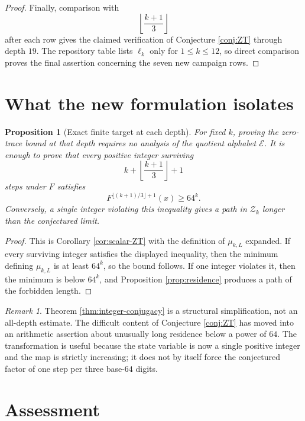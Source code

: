 \documentclass[11pt]{article}
\newtheorem{proposition}[theorem]{Proposition}
\theoremstyle{definition}
\theoremstyle{remark}
\newtheorem{remark}[theorem]{Remark}
\newcommand{\E}{\mathcal{E}}
\begin{document}
\begin{proof}
Finally, comparison with
\[
\left\lfloor\frac{k+1}{3}\right\rfloor
\]
after each row gives the claimed verification of Conjecture \ref{conj:ZT} through depth $19$. The repository table lists $\ell_k$ only for $1\le k\le12$, so direct comparison proves the final assertion concerning the seven new campaign rows.
\end{proof}

\section{What the new formulation isolates}

\begin{proposition}[Exact finite target at each depth]
\label{prop:finite-target}
For fixed $k$, proving the zero-trace bound at that depth requires no analysis of the quotient alphabet $\E$. It is enough to prove that every positive integer surviving
\[
k+\left\lfloor\frac{k+1}{3}\right\rfloor+1
\]
steps under $F$ satisfies
\[
F^{\lfloor(k+1)/3\rfloor+1}(x)\ge64^k.
\]
Conversely, a single integer violating this inequality gives a path in $\mathcal Z_k$ longer than the conjectured limit.
\end{proposition}

\begin{proof}
This is Corollary \ref{cor:scalar-ZT} with the definition of $\mu_{k,L}$ expanded. If every surviving integer satisfies the displayed inequality, then the minimum defining $\mu_{k,L}$ is at least $64^k$, so the bound follows. If one integer violates it, then the minimum is below $64^k$, and Proposition \ref{prop:residence} produces a path of the forbidden length.
\end{proof}

\begin{remark}
Theorem \ref{thm:integer-conjugacy} is a structural simplification, not an all-depth estimate. The difficult content of Conjecture \ref{conj:ZT} has moved into an arithmetic assertion about unusually long residence below a power of $64$. The transformation is useful because the state variable is now a single positive integer and the map is strictly increasing; it does not by itself force the conjectured factor of one step per three base-$64$ digits.
\end{remark}

\section{Assessment}
\end{document}
